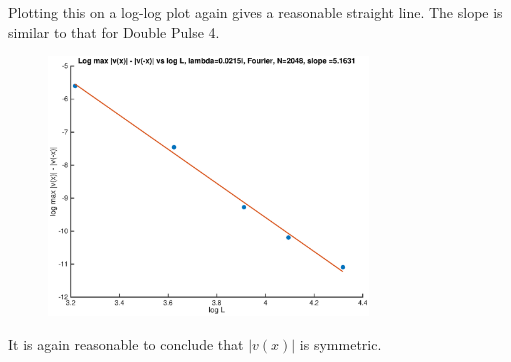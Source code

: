 \documentclass[12pt]{article}
\begin{document}
Plotting this on a log-log plot again gives a reasonable straight line. The slope is similar to that for Double Pulse 4.

\begin{figure}[H]
\includegraphics[width=8.5cm]{4doubleflipdiffloglogL}
\end{figure}
It is again reasonable to conclude that $|v(x)|$ is symmetric.
\end{document}
